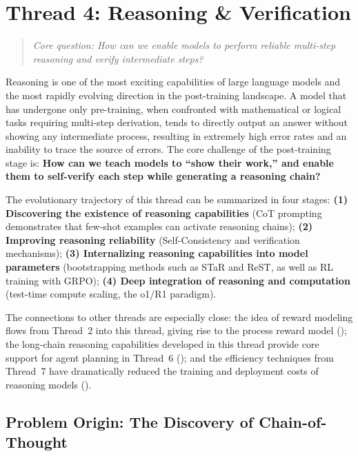 \section{Thread 4: Reasoning \& Verification}
\label{sec:t4}

\begin{quote}
\textit{Core question: How can we enable models to perform reliable multi-step reasoning and verify intermediate steps?}
\end{quote}

\noindent
Reasoning is one of the most exciting capabilities of large language models and the most rapidly evolving direction in the post-training landscape.
A model that has undergone only pre-training, when confronted with mathematical or logical tasks requiring multi-step derivation,
tends to directly output an answer without showing any intermediate process, resulting in extremely high error rates and an inability to trace the source of errors.
The core challenge of the post-training stage is:
\textbf{How can we teach models to ``show their work,''
and enable them to self-verify each step while generating a reasoning chain?}

The evolutionary trajectory of this thread can be summarized in four stages:
\textbf{(1) Discovering the existence of reasoning capabilities} (CoT prompting demonstrates that few-shot examples can activate reasoning chains);
\textbf{(2) Improving reasoning reliability} (Self-Consistency and verification mechanisms);
\textbf{(3) Internalizing reasoning capabilities into model parameters} (bootstrapping methods such as STaR and ReST, as well as RL training with GRPO);
\textbf{(4) Deep integration of reasoning and computation} (test-time compute scaling, the o1/R1 paradigm).

The connections to other threads are especially close:
the idea of reward modeling flows from Thread~2 into this thread, giving rise to the process reward model
();
the long-chain reasoning capabilities developed in this thread provide core support for agent planning in Thread~6
();
and the efficiency techniques from Thread~7 have dramatically reduced the training and deployment costs of reasoning models
().


\subsection{Problem Origin: The Discovery of Chain-of-Thought}
\label{sec:t4-origin}

